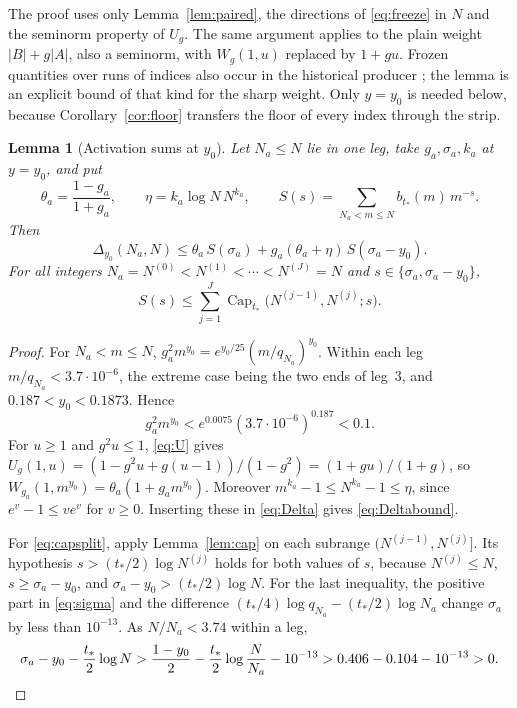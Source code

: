 \documentclass[11pt]{article}
\newtheorem{lemma}[theorem]{Lemma}
\theoremstyle{remark}
\newcommand{\tstar}{t_*}
\DeclareMathOperator{\Capbd}{Cap}
\numberwithin{equation}{section}
\begin{document}
The proof uses only Lemma~\ref{lem:paired}, the directions of
\eqref{eq:freeze} in $N$ and the seminorm property of $U_g$. The same
argument applies to the plain weight $|B|+g|A|$, also a seminorm, with
$W_g(1,u)$ replaced by $1+gu$. Frozen quantities over runs of indices
also occur in the historical producer \cite[Section 3]{audit3}; the
lemma is an explicit bound of that kind for the sharp weight. Only
$y=y_0$ is needed below, because Corollary~\ref{cor:floor} transfers the
floor of every index through the strip.

\begin{lemma}[Activation sums at $y_0$]\label{lem:actsum}
Let $N_a\le N$ lie in one leg, take $g_a,\sigma_a,k_a$ at $y=y_0$, and
put
\[
 \theta_a=\frac{1-g_a}{1+g_a},\qquad
 \eta=k_a\log N\,N^{k_a},\qquad
 S(s)=\sum_{N_a<m\le N}b_{\tstar}(m)\,m^{-s}.
\]
Then
\begin{equation}\label{eq:Deltabound}
 \Delta_{y_0}(N_a,N)\le\theta_a\,S(\sigma_a)
 +g_a(\theta_a+\eta)\,S(\sigma_a-y_0).
\end{equation}
For all integers $N_a=N^{(0)}<N^{(1)}<\cdots<N^{(J)}=N$ and
$s\in\{\sigma_a,\sigma_a-y_0\}$,
\begin{equation}\label{eq:capsplit}
 S(s)\le\sum_{j=1}^{J}\Capbd_{\tstar}\bigl(N^{(j-1)},N^{(j)};s\bigr).
\end{equation}
\end{lemma}
\begin{proof}
For $N_a<m\le N$, $g_a^2m^{y_0}=e^{y_0/25}(m/q_{N_a})^{y_0}$. Within
each leg $m/q_{N_a}<3.7\cdot10^{-6}$, the extreme case being the two ends
of leg~3, and $0.187<y_0<0.1873$. Hence
\[
 g_a^2m^{y_0}<e^{0.0075}(3.7\cdot10^{-6})^{0.187}<0.1.
\]
For $u\ge1$ and $g^2u\le1$, \eqref{eq:U} gives
$U_g(1,u)=(1-g^2u+g(u-1))/(1-g^2)=(1+gu)/(1+g)$, so
$W_{g_a}(1,m^{y_0})=\theta_a(1+g_am^{y_0})$. Moreover
$m^{k_a}-1\le N^{k_a}-1\le\eta$, since $e^v-1\le ve^v$ for $v\ge0$.
Inserting these in \eqref{eq:Delta} gives \eqref{eq:Deltabound}.

For \eqref{eq:capsplit}, apply Lemma~\ref{lem:cap} on each subrange
$(N^{(j-1)},N^{(j)}]$. Its hypothesis $s>(\tstar/2)\log N^{(j)}$ holds
for both values of $s$, because $N^{(j)}\le N$, $s\ge\sigma_a-y_0$, and
$\sigma_a-y_0>(\tstar/2)\log N$. For the last inequality, the positive
part in \eqref{eq:sigma} and the difference
$(\tstar/4)\log q_{N_a}-(\tstar/2)\log N_a$ change $\sigma_a$ by less
than $10^{-13}$. As $N/N_a<3.74$ within a leg,
\[
 \sigma_a-y_0-\frac{\tstar}{2}\log N
 >\frac{1-y_0}{2}-\frac{\tstar}{2}\log\frac{N}{N_a}-10^{-13}
 >0.406-0.104-10^{-13}>0.\qedhere
\]
\end{proof}
\end{document}
